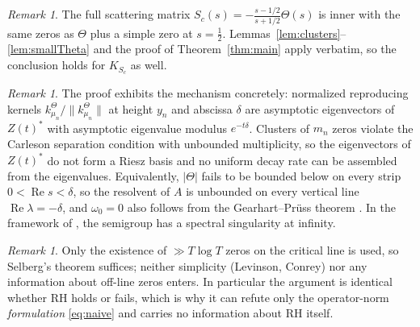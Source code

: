 \documentclass[11pt]{amsart}
\theoremstyle{remark}
\newtheorem{remark}[theorem]{Remark}
\newcommand{\re}{\operatorname{Re}}
\begin{document}
\begin{remark}\label{rem:extra-factor}
The full scattering matrix $S_{c}(s)=-\frac{s-1/2}{s+1/2}\Theta(s)$ is
inner with the same zeros as $\Theta$ plus a simple zero at
$s=\tfrac12$. Lemmas~\ref{lem:clusters}--\ref{lem:smallTheta} and the
proof of Theorem~\ref{thm:main} apply verbatim, so the conclusion holds
for $K_{S_{c}}$ as well.
\end{remark}

\begin{remark}
The proof exhibits the mechanism concretely: normalized reproducing
kernels $k^{\Theta}_{\mu_{n}}/\|k^{\Theta}_{\mu_{n}}\|$ at height
$y_{n}$ and abscissa $\delta$ are asymptotic eigenvectors of
$Z(t)^{*}$ with asymptotic eigenvalue modulus $e^{-t\delta}$. Clusters
of $m_{n}$ zeros violate the Carleson separation condition with
unbounded multiplicity, so the eigenvectors of $Z(t)^{*}$ do not form a
Riesz basis and no uniform decay rate can be assembled from the
eigenvalues. Equivalently, $|\Theta|$ fails to be bounded below on
every strip $0<\re s<\delta$, so the resolvent of $A$ is unbounded on
every vertical line $\re\lambda=-\delta$, and $\omega_{0}=0$ also
follows from the Gearhart--Pr\"uss theorem \cite{GearhartPruess}. In
the framework of \cite{NabokoRomanov}, the semigroup has a spectral
singularity at infinity.
\end{remark}

\begin{remark}
Only the existence of $\gg T\log T$ zeros on the critical line is used,
so Selberg's theorem suffices; neither simplicity (Levinson, Conrey)
nor any information about off-line zeros enters. In particular the
argument is identical whether RH holds or fails, which is why it can
refute only the operator-norm \emph{formulation} \eqref{eq:naive} and
carries no information about RH itself.
\end{remark}
\end{document}
